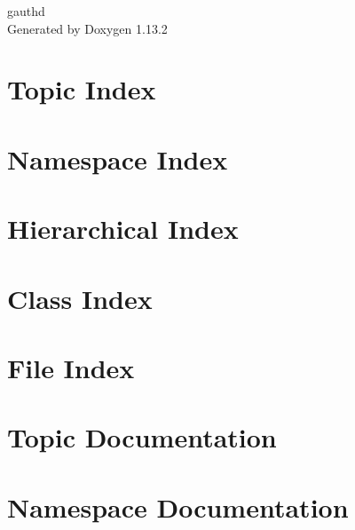 \documentclass[twoside]{book}
\newcommand{\+}{\discretionary{\mbox{\scriptsize$\hookleftarrow$}}{}{}}
\newcommand{\clearemptydoublepage}{%
    \newpage{\pagestyle{empty}\cleardoublepage}%
  }
\begin{document}
  \raggedbottom
    \hypersetup{pageanchor=false,
                bookmarksnumbered=true,
                pdfencoding=unicode
               }
  \begin{titlepage}
  \vspace*{7cm}
  \begin{center}%
  {\Large gauthd}\\
  \vspace*{1cm}
  {\large Generated by Doxygen 1.13.2}\\
  \end{center}
  \end{titlepage}
  \clearemptydoublepage
  \tableofcontents
  \clearemptydoublepage
  \hypersetup{pageanchor=true}

\chapter{Topic Index}

\chapter{Namespace Index}

\chapter{Hierarchical Index}

\chapter{Class Index}

\chapter{File Index}

\chapter{Topic Documentation}



\chapter{Namespace Documentation}

\end{document}
